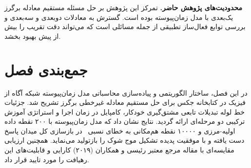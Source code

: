 \textbf{محدودیت‌های پژوهش حاضر.} تمرکز این پژوهش بر حل مسئله مستقیم معادله برگرز یک‌بعدی با مدل زمان‌پیوسته بوده است. گسترش به معادلات دوبعدی و سه‌بعدی و بررسی توابع فعال‌ساز تطبیقی از جمله مسائلی است که می‌تواند دقت تقریب را بیش از پیش بهبود بخشد.

\section{جمع‌بندی فصل}
\label{sec:ch4-summary}

در این فصل، ساختار الگوریتمی و پیاده‌سازی محاسباتی مدل زمان‌پیوسته شبکه آگاه از فیزیک در کتابخانه جکس برای حل مستقیم معادله غیرخطی برگرز تشریح شد. جزئیات خط لوله تبدیلات تابعی مشتق‌گیری خودکار، کامپایل در زمان اجرا و استراتژی آموزش ترکیبی دو مرحله‌ای ارائه گردید. نتایج نشان داد که مدل زمان‌پیوسته با ۲۰۰ نقطه داده اولیه-مرزی و ۱۰۰۰۰ نقطه هم‌مکانی به خطای نسبی \FwdRelErr\ در بازسازی کل میدان پاسخ دست یافته و با موفقیت پدیده تشکیل موج شوک را بازتولید می‌نماید. همچنین ارزیابی مقایسه‌ای با مقاله مرجع معتبر رئیسی و همکاران (۲۰۱۹) کارایی و قابلیت‌های این رهیافت را مورد تایید قرار داد.
